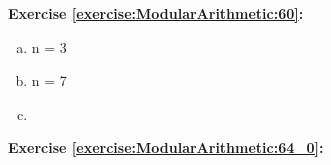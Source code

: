 \noindent\textbf{Exercise \ref{exercise:ModularArithmetic:60}:}
\begin{enumerate}[(a)]
\item
n = 3

\item
n = 7

\item
\end{enumerate}


\noindent\textbf{Exercise \ref{exercise:ModularArithmetic:64_0}:}

